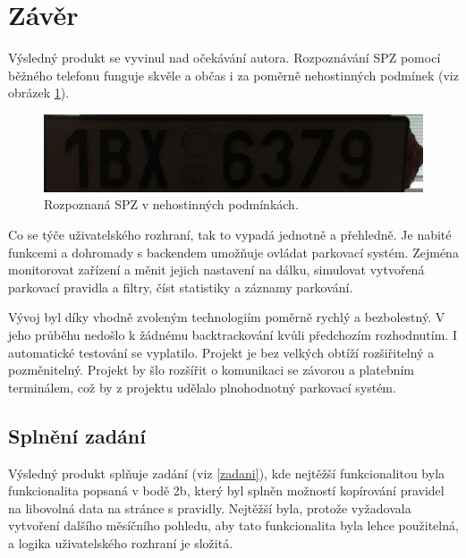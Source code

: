 \chapter*{Závěr}

\noindent
Výsledný produkt se vyvinul nad očekávání autora. Rozpoznávání SPZ 
pomocí běžného telefonu funguje skvěle a
občas i za poměrně nehostinných podmínek (viz obrázek \ref{fig:recogn}).

\begin{figure}[!htb] \centering
  \includegraphics[width=145mm]{../img/example_recognition.png}
  \caption{Rozpoznaná SPZ v nehostinných podmínkách.}
  \label{fig:recogn}
\end{figure}

\noindent
Co se týče uživatelského rozhraní, tak to vypadá jednotně a přehledně.
Je nabité funkcemi a dohromady s backendem umožňuje ovládat parkovací systém. Zejména monitorovat
zařízení a měnit jejich nastavení na dálku, simulovat vytvořená parkovací pravidla
a filtry, číst statistiky a záznamy parkování.

Vývoj byl díky vhodně zvoleným technologiím poměrně rychlý a bezbolestný.
V jeho průběhu nedošlo k žádnému backtrackování kvůli předchozím rozhodnutím.
I automatické testování se vyplatilo.
Projekt je bez velkých obtíží rozšiřitelný a pozměnitelný.
Projekt by šlo rozšířit o komunikaci se závorou a platebním terminálem,
což by z projektu udělalo plnohodnotný parkovací systém.

\section*{Splnění zadání}

\noindent
Výsledný produkt splňuje zadání (viz \ref{zadani}), kde nejtěžší funkcionalitou
byla funkcionalita popsaná v bodě 2b, který byl splněn možností kopírování pravidel
na libovolná data na stránce s pravidly. Nejtěžší byla, protože vyžadovala vytvoření
dalšího měsíčního pohledu, aby tato funkcionalita byla lehce použitelná,
a logika uživatelského rozhraní je složitá.



